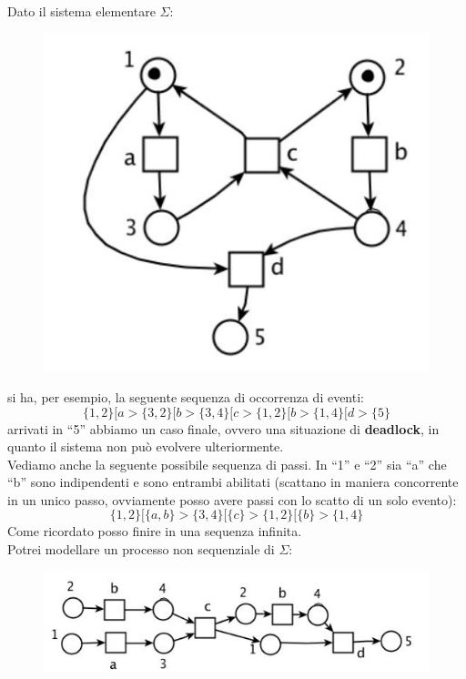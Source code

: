 \documentclass[a4paper,12pt, oneside]{book}
\begin{document}
\begin{esempio}
  Dato il sistema elementare $\Sigma$:
  \begin{figure}[H]
    \centering
    \includegraphics[scale = 0.4]{img/seq.jpg}
  \end{figure}
  si ha, per esempio, la seguente sequenza di occorrenza di eventi:
  \[\{1, 2\}[a > \{3, 2\}[b > \{3, 4\}[c > \{1, 2\}[b > \{1, 4\}[d > \{5\}\]
  arrivati in ``5'' abbiamo un caso finale, ovvero una situazione di
  \textbf{deadlock}, in quanto il sistema non può evolvere ulteriormente.\\
  Vediamo anche la seguente possibile sequenza di passi. In ``1'' e ``2'' sia
  ``a'' che ``b'' sono indipendenti e sono entrambi abilitati (scattano in
  maniera concorrente in un unico passo, ovviamente posso avere passi con lo
  scatto di un solo evento):
  \[\{1, 2\}[\{a, b\} > \{3, 4\}[\{c\} > \{1, 2\}[\{b\} > \{1, 4\}\]
  Come ricordato posso finire in una sequenza infinita.\\
  Potrei modellare un processo non sequenziale di $\Sigma$:
  \begin{figure}[H]
    \centering
    \includegraphics[scale = 0.4]{img/seq5.jpg}
  \end{figure}
\end{esempio}
\end{document}
